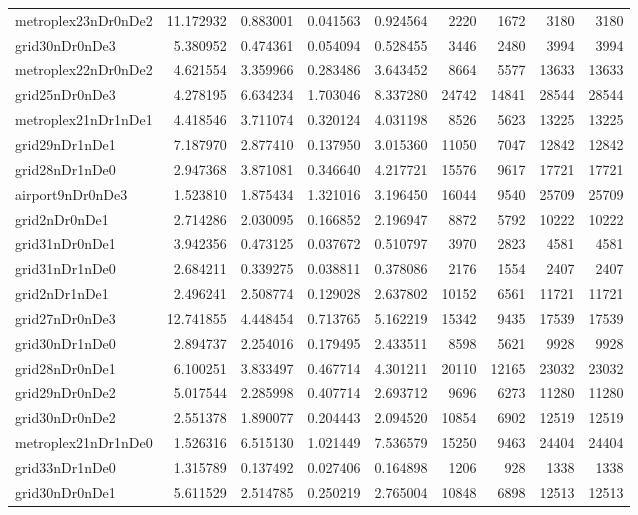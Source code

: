\begin{longtable}{|l|r|r|r|r|r|r|r|r|}
metroplex23nDr0nDe2 & 11.172932 & 0.883001 & 0.041563 & 0.924564 & 2220 & 1672 & 3180 & 3180 \\
grid30nDr0nDe3 & 5.380952 & 0.474361 & 0.054094 & 0.528455 & 3446 & 2480 & 3994 & 3994 \\
metroplex22nDr0nDe2 & 4.621554 & 3.359966 & 0.283486 & 3.643452 & 8664 & 5577 & 13633 & 13633 \\
grid25nDr0nDe3 & 4.278195 & 6.634234 & 1.703046 & 8.337280 & 24742 & 14841 & 28544 & 28544 \\
metroplex21nDr1nDe1 & 4.418546 & 3.711074 & 0.320124 & 4.031198 & 8526 & 5623 & 13225 & 13225 \\
grid29nDr1nDe1 & 7.187970 & 2.877410 & 0.137950 & 3.015360 & 11050 & 7047 & 12842 & 12842 \\
grid28nDr1nDe0 & 2.947368 & 3.871081 & 0.346640 & 4.217721 & 15576 & 9617 & 17721 & 17721 \\
airport9nDr0nDe3 & 1.523810 & 1.875434 & 1.321016 & 3.196450 & 16044 & 9540 & 25709 & 25709 \\
grid2nDr0nDe1 & 2.714286 & 2.030095 & 0.166852 & 2.196947 & 8872 & 5792 & 10222 & 10222 \\
grid31nDr0nDe1 & 3.942356 & 0.473125 & 0.037672 & 0.510797 & 3970 & 2823 & 4581 & 4581 \\
grid31nDr1nDe0 & 2.684211 & 0.339275 & 0.038811 & 0.378086 & 2176 & 1554 & 2407 & 2407 \\
grid2nDr1nDe1 & 2.496241 & 2.508774 & 0.129028 & 2.637802 & 10152 & 6561 & 11721 & 11721 \\
grid27nDr0nDe3 & 12.741855 & 4.448454 & 0.713765 & 5.162219 & 15342 & 9435 & 17539 & 17539 \\
grid30nDr1nDe0 & 2.894737 & 2.254016 & 0.179495 & 2.433511 & 8598 & 5621 & 9928 & 9928 \\
grid28nDr0nDe1 & 6.100251 & 3.833497 & 0.467714 & 4.301211 & 20110 & 12165 & 23032 & 23032 \\
grid29nDr0nDe2 & 5.017544 & 2.285998 & 0.407714 & 2.693712 & 9696 & 6273 & 11280 & 11280 \\
grid30nDr0nDe2 & 2.551378 & 1.890077 & 0.204443 & 2.094520 & 10854 & 6902 & 12519 & 12519 \\
metroplex21nDr1nDe0 & 1.526316 & 6.515130 & 1.021449 & 7.536579 & 15250 & 9463 & 24404 & 24404 \\
grid33nDr1nDe0 & 1.315789 & 0.137492 & 0.027406 & 0.164898 & 1206 & 928 & 1338 & 1338 \\
grid30nDr0nDe1 & 5.611529 & 2.514785 & 0.250219 & 2.765004 & 10848 & 6898 & 12513 & 12513 \\

\end{longtable}
